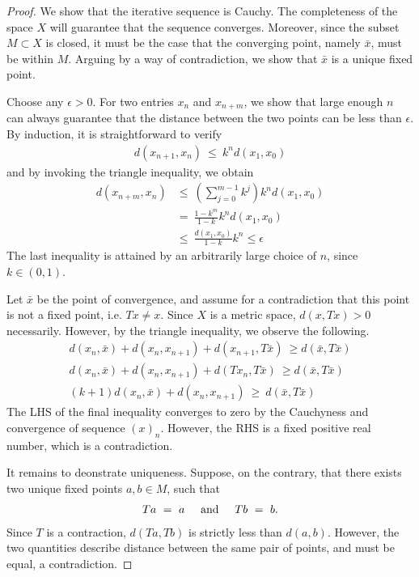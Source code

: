 \documentclass[10pt]{article}
\numberwithin{equation}{section}
\newcommand{\textAnd}{
    {
        \hspace{5mm}
        \textrm{and}
        \hspace{5mm}
    }
}
\numberwithin{theorem}{section}
\numberwithin{proposition}{section}
\numberwithin{lemma}{section}
\numberwithin{corollary}{section}
\numberwithin{remark}{section}
\numberwithin{definition}{section}
\numberwithin{example}{section}
\numberwithin{conjecture}{section}
\numberwithin{question}{section}
\begin{document}
\begin{proof}
    We show that the iterative sequence is Cauchy. The completeness of 
    the space $X$ will guarantee that the sequence converges. Moreover, 
    since the subset $M \subset X$ is closed, it must be the case that 
    the converging point, namely $\bar x$, must be within $M$. Arguing 
    by a way of contradiction, we show that $\bar x$ is a unique fixed point. 

    Choose any $\epsilon > 0 $. For two entries $x_n $ and $x_{n + m}$, 
    we show that large enough $n$ can always guarantee that the distance 
    between the two points can be less than $\epsilon$. By induction, 
    it is straightforward to verify 
    \begin{align}
        d(x_{n + 1}, x_n) \ \leq \ k^n d(x_1, x_0)
    \end{align}
    and by invoking the triangle inequality, we obtain 
    \begin{align}
        d(x_{n + m}, x_n) & \leq \ \left(\sum_{j = 0}^{m - 1} k^j\right) k^n d(x_1, x_0) \\
        & = \ \frac{1 - k^m}{1 - k} k^n d(x_1, x_0) \\ 
        & \leq \ \frac {d(x_1, x_0)} {1 - k} k^n \leq \epsilon
    \end{align}
    The last inequality is attained by an arbitrarily large choice of $n$, since 
    $k \in (0, 1)$. 
    
    Let $\bar x$ be the point of convergence, and assume for a contradiction 
    that this point is not a fixed point, i.e. $Tx \neq x$. Since 
    $X$ is a metric space, $d(x, Tx) > 0$ necessarily. However, by the 
    triangle inequality, we observe the following. 
    \begin{align}
        d(x_n, \bar x) + d(x_n, x_{n + 1}) + d(x_{n + 1}, T\bar x) \ \geq d(\bar x, T\bar x) \nonumber \\  
        d(x_n, \bar x) + d(x_n, x_{n + 1}) + d(Tx_{n}, T\bar x) \ \geq d(\bar x, T\bar x) \nonumber \\  
        (k + 1) d(x_n, \bar x) + d(x_n, x_{n + 1}) \ \geq \ d(\bar x, T\bar x)
    \end{align}
    The LHS of the final inequality converges to zero by the Cauchyness and 
    convergence of sequence $(x)_n$. However, the RHS is a fixed positive real number, which is 
    a contradiction. 

    It remains to deonstrate uniqueness. Suppose, on the contrary, that 
    there exists two unique fixed points $a, b \in M$, such that 
    \begin{align}
        Ta \ =\ a \textAnd Tb \ =\ b.
    \end{align}
    Since $T$ is a contraction, $d(Ta, Tb)$ is strictly less than $d(a, b)$. However, 
    the two quantities describe distance between the same pair of points, and must be 
    equal, a contradiction. 
\end{proof}
\end{document}
